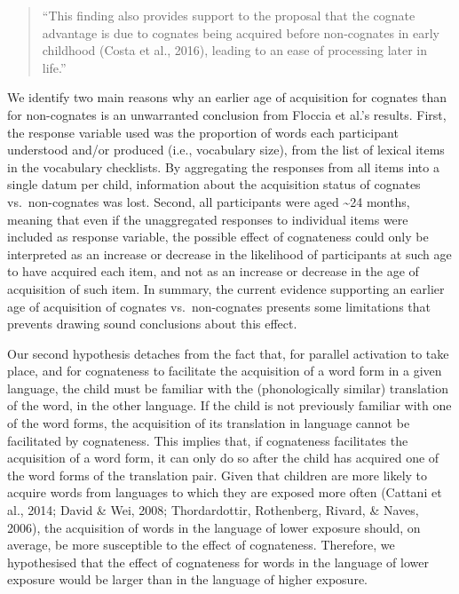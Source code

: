 \documentclass[
  english,
  man,man,floatsintext]{apa6}
\begin{document}
\begin{quote}
``This finding also provides support to the proposal that the cognate advantage is due to cognates being acquired before non-cognates in early childhood (Costa et al., 2016), leading to an ease of processing later in life.''
\end{quote}

We identify two main reasons why an earlier age of acquisition for cognates than for non-cognates is an unwarranted conclusion from Floccia et al.'s results. First, the response variable used was the proportion of words each participant understood and/or produced (i.e., vocabulary size), from the list of lexical items in the vocabulary checklists. By aggregating the responses from all items into a single datum per child, information about the acquisition status of cognates vs.~non-cognates was lost. Second, all participants were aged \textasciitilde24 months, meaning that even if the unaggregated responses to individual items were included as response variable, the possible effect of cognateness could only be interpreted as an increase or decrease in the likelihood of participants at such age to have acquired each item, and not as an increase or decrease in the age of acquisition of such item. In summary, the current evidence supporting an earlier age of acquisition of cognates vs.~non-cognates presents some limitations that prevents drawing sound conclusions about this effect.

Our second hypothesis detaches from the fact that, for parallel activation to take place, and for cognateness to facilitate the acquisition of a word form in a given language, the child must be familiar with the (phonologically similar) translation of the word, in the other language. If the child is not previously familiar with one of the word forms, the acquisition of its translation in language cannot be facilitated by cognateness. This implies that, if cognateness facilitates the acquisition of a word form, it can only do so after the child has acquired one of the word forms of the translation pair. Given that children are more likely to acquire words from languages to which they are exposed more often (Cattani et al., 2014; David \& Wei, 2008; Thordardottir, Rothenberg, Rivard, \& Naves, 2006), the acquisition of words in the language of lower exposure should, on average, be more susceptible to the effect of cognateness. Therefore, we hypothesised that the effect of cognateness for words in the language of lower exposure would be larger than in the language of higher exposure.
\end{document}
